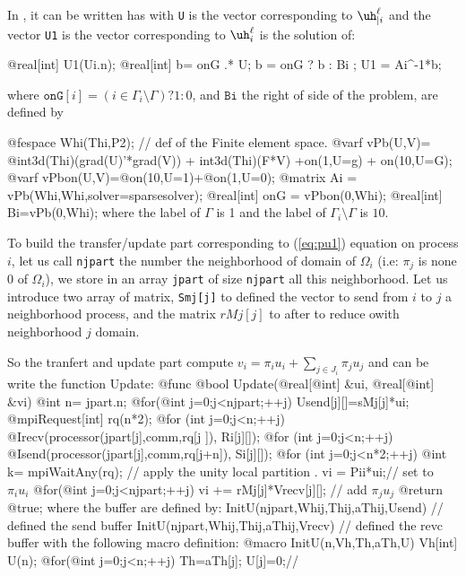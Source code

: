 \documentclass[a4paper,twoside,12pt]{book}
\begin{document}
In \freefempp, it can be written has with \texttt{U} is the vector corresponding to $\uh^{\ell}_{|i}$ and the 
vector \texttt{U1}  is the vector corresponding to $\uh^\ell_{i}$  is the solution of: 

\bFF
  @real[int] U1(Ui.n); 
  @real[int] b= onG .* U; 
  b  = onG ? b : Bi ;  
  U1 = Ai^-1*b;	
  
\eFF
where 
 $\mathtt{onG}[i] =(i \in \Gamma_i\setminus\Gamma) ? 1 : 0   $, and $\mathtt{Bi}$
the right of side of the problem, are defined  by 


\bFF
  @fespace Whi(Thi,P2); // def of the Finite element space.
  @varf vPb(U,V)= @int3d(Thi)(grad(U)'*grad(V)) + int3d(Thi)(F*V) +on(1,U=g) + on(10,U=G);  
  @varf vPbon(U,V)=@on(10,U=1)+@on(1,U=0);
  @matrix Ai = vPb(Whi,Whi,solver=sparsesolver);
  @real[int] onG = vPbon(0,Whi);
  @real[int] Bi=vPb(0,Whi);  
\eFF\smallskip
where  the \freefempp  label of $\Gamma$ is 1 and the label of
$\Gamma_i\setminus \Gamma$ is $10$.


\medskip
To build the transfer/update part corresponding to (\ref{eq:pu1}) equation  
 on process $i$, let us call  \texttt{njpart} the number  the neighborhood of domain of $\Omega_i$
(i.e: $\pi_j$ is none $0$ of $\Omega_i$), we store in an array \texttt{jpart} of size  \texttt{njpart} 
 all this  neighborhood. 
Let us introduce two  array of  matrix,
\texttt{Smj[j]} to defined the vector to send from $i$ to $j$ a neighborhood process,
and the matrix $rMj[j]$ to after to  reduce owith  neighborhood $j$ domain.   

So the tranfert and update part  compute 
$v_i= \pi_i u_i + \sum_{j\in J_i} \pi_j  u_j  $ and  can be write  the
\freefempp function Update:
\bFF
@func @bool Update(@real[@int] &ui, @real[@int] &vi)
{ @int n= jpart.n;
  @for(@int j=0;j<njpart;++j)  Usend[j][]=sMj[j]*ui;    
  @mpiRequest[int] rq(n*2);
  @for (int j=0;j<n;++j) @Irecv(processor(jpart[j],comm,rq[j  ]), Ri[j][]);       
  @for (int j=0;j<n;++j) @Isend(processor(jpart[j],comm,rq[j+n]), Si[j][]); 
  @for (int j=0;j<n*2;++j) @int k= mpiWaitAny(rq);
  // apply the unity local partition .\hfilll
   vi = Pii*ui;// set to $ \pi_i u_i$
   @for(@int j=0;j<njpart;++j)  vi += rMj[j]*Vrecv[j][]; // add $\pi_j  u_j$ 
   @return @true; }
\eFF\smallskip
where the buffer are defined by:
\smallskip\bFF
  InitU(njpart,Whij,Thij,aThij,Usend)  // defined the send buffer\hfilll
  InitU(njpart,Whij,Thij,aThij,Vrecv)  //  defined the revc buffer\hfilll
\eFF\smallskip
with the following macro definition: 
\smallskip\bFF
@macro InitU(n,Vh,Th,aTh,U) Vh[int] U(n); @for(@int j=0;j<n;++j) {Th=aTh[j];  U[j]=0;}//
\eFF
\end{document}
